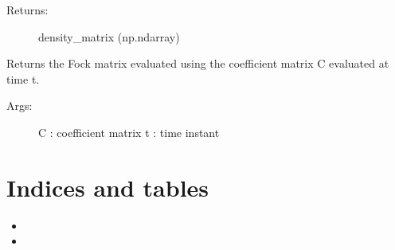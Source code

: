 \documentclass[letterpaper,10pt,english]{sphinxmanual}
\begin{document}
\begin{fulllineitems}
\begin{fulllineitems}
\begin{description}
\item[{Returns:}] \leavevmode
density\_matrix (np.ndarray)

\end{description}

\end{fulllineitems}


\begin{fulllineitems}
\label{\detokenize{index:do.RHF.fill_fock_matrix}}
Returns the Fock matrix evaluated using the coefficient matrix C evaluated at time t.
\begin{description}
\item[{Args:}] \leavevmode
C : coefficient matrix
t : time instant

\end{description}

\end{fulllineitems}


\end{fulllineitems}



\chapter{Indices and tables}
\label{\detokenize{index:indices-and-tables}}\begin{itemize}
\item {} 

\item {} 

\end{itemize}


\renewcommand{\indexname}{Python Module Index}
\begin{sphinxtheindex}
\let\bigletter\sphinxstyleindexlettergroup
\bigletter{d}
\item\relax{}
\end{sphinxtheindex}

\renewcommand{\indexname}{Index}
\printindex
\end{document}
